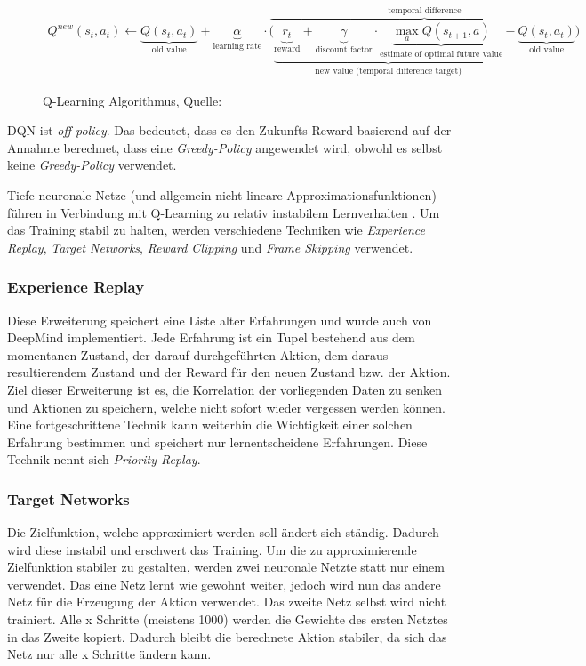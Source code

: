 \documentclass[12pt,a4paper]{article}
\begin{document}
\begin{figure}[!h]
	\begin{eqnarray}
	{\displaystyle Q^{new}(s_{t},a_{t})\leftarrow \underbrace {Q(s_{t},a_{t})} _{\text{old value}}+\underbrace {\alpha } _{\text{learning rate}}\cdot \overbrace {{\bigg (}\underbrace {\underbrace {r_{t}} _{\text{reward}}+\underbrace {\gamma } _{\text{discount factor}}\cdot \underbrace {\max _{a}Q(s_{t+1},a)} _{\text{estimate of optimal future value}}} _{\text{new value (temporal difference target)}}-\underbrace {Q(s_{t},a_{t})} _{\text{old value}}{\bigg )}} ^{\text{temporal difference}}}
	\end{eqnarray}
	\caption{Q-Learning Algorithmus, Quelle: \cite{wikimedia:qlearning}}
	\label{fig:qlearning}
\end{figure}

DQN ist \textit{off-policy}.
Das bedeutet, dass es den Zukunfts-Reward basierend auf der Annahme berechnet, dass eine \textit{Greedy-Policy} angewendet wird, obwohl es selbst keine \textit{Greedy-Policy} verwendet.
\cite[p. 3]{mnih:2013}

Tiefe neuronale Netze (und allgemein nicht-lineare Approximationsfunktionen) führen in Verbindung mit Q-Learning zu relativ instabilem Lernverhalten \cite[p. 6]{mnih:2013}.
Um das Training stabil zu halten, werden verschiedene Techniken wie \textit{Experience Replay}, \textit{Target Networks}, \textit{Reward Clipping} und \textit{Frame Skipping} verwendet.

\subsubsection{Experience Replay}
\label{sec:rl:dqn:experience_replay}
Diese Erweiterung speichert eine Liste alter \glqq{}Erfahrungen\grqq{} und wurde auch von DeepMind \cite[p. 5]{mnih:2013} implementiert.
Jede Erfahrung ist ein Tupel bestehend aus dem momentanen Zustand, der darauf durchgeführten Aktion, dem daraus resultierendem Zustand und der Reward für den neuen Zustand bzw. der Aktion.
Ziel dieser Erweiterung ist es, die Korrelation der vorliegenden Daten zu senken und Aktionen zu speichern, welche nicht sofort wieder \glqq{}vergessen\grqq{} werden können.
Eine fortgeschrittene Technik kann weiterhin die \glqq{}Wichtigkeit\grqq{} einer solchen Erfahrung bestimmen und speichert nur lernentscheidene Erfahrungen.
Diese Technik nennt sich \textit{Priority-Replay}.

\subsubsection{Target Networks}
Die Zielfunktion, welche approximiert werden soll ändert sich ständig.
Dadurch wird diese instabil und erschwert das Training.
Um die zu approximierende Zielfunktion stabiler zu gestalten, werden zwei neuronale Netzte statt nur einem verwendet.
Das eine Netz lernt wie gewohnt weiter, jedoch wird nun das andere Netz für die Erzeugung der Aktion verwendet.
Das zweite Netz selbst wird nicht trainiert.
Alle x Schritte (meistens 1000) werden die Gewichte des ersten Netztes in das Zweite kopiert.
Dadurch bleibt die berechnete Aktion stabiler, da sich das Netz nur alle x Schritte ändern kann.
\end{document}
